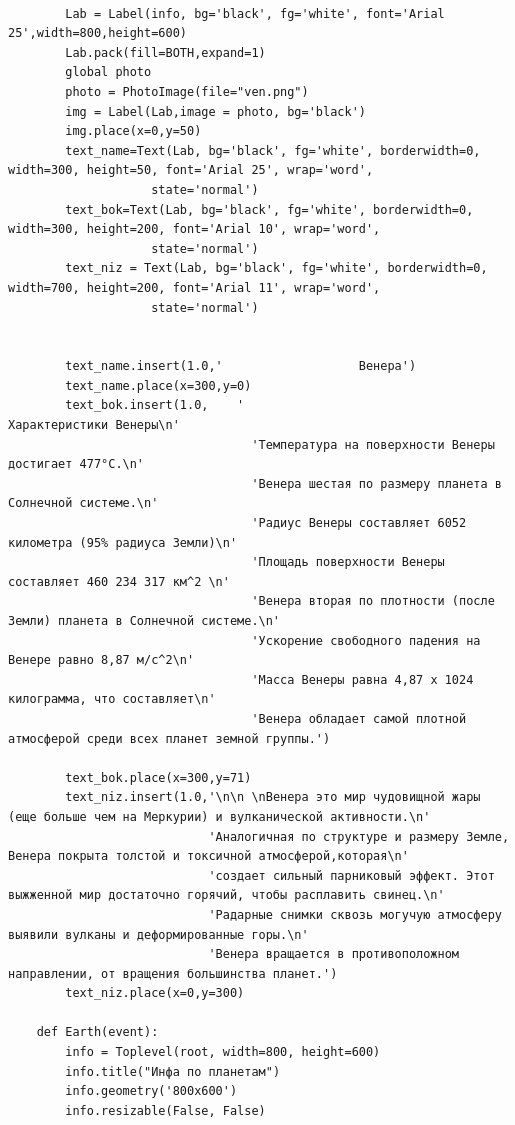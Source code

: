 \documentclass[11pt,a4paper]{report}
\begin{document}
\begin{verbatim}
    
        Lab = Label(info, bg='black', fg='white', font='Arial 25',width=800,height=600)  
        Lab.pack(fill=BOTH,expand=1)
        global photo
        photo = PhotoImage(file="ven.png")
        img = Label(Lab,image = photo, bg='black')
        img.place(x=0,y=50)
        text_name=Text(Lab, bg='black', fg='white', borderwidth=0, width=300, height=50, font='Arial 25', wrap='word',
                    state='normal')  
        text_bok=Text(Lab, bg='black', fg='white', borderwidth=0, width=300, height=200, font='Arial 10', wrap='word',
                    state='normal')  
        text_niz = Text(Lab, bg='black', fg='white', borderwidth=0, width=700, height=200, font='Arial 11', wrap='word',
                    state='normal')  
    
       
        text_name.insert(1.0,'                   Венера')
        text_name.place(x=300,y=0)
        text_bok.insert(1.0,    '                                           Характеристики Венеры\n' 
                                  'Температура на поверхности Венеры достигает 477°C.\n'
                                  'Венера шестая по размеру планета в Солнечной системе.\n'
                                  'Радиус Венеры составляет 6052 километра (95% радиуса Земли)\n'
                                  'Площадь поверхности Венеры составляет 460 234 317 км^2 \n'
                                  'Венера вторая по плотности (после Земли) планета в Солнечной системе.\n'
                                  'Ускорение свободного падения на Венере равно 8,87 м/c^2\n'
                                  'Масса Венеры равна 4,87 х 1024 килограмма, что составляет\n'
                                  'Венера обладает самой плотной атмосферой среди всех планет земной группы.')    
        
        text_bok.place(x=300,y=71)        
        text_niz.insert(1.0,'\n\n \nВенера это мир чудовищной жары (еще больше чем на Меркурии) и вулканической активности.\n'
                            'Аналогичная по структуре и размеру Земле, Венера покрыта толстой и токсичной атмосферой,которая\n'
                            'создает сильный парниковый эффект. Этот выжженной мир достаточно горячий, чтобы расплавить свинец.\n'
                            'Радарные снимки сквозь могучую атмосферу выявили вулканы и деформированные горы.\n'
                            'Венера вращается в противоположном направлении, от вращения большинства планет.')
        text_niz.place(x=0,y=300)

    def Earth(event):  
        info = Toplevel(root, width=800, height=600)
        info.title("Инфа по планетам")
        info.geometry('800x600')
        info.resizable(False, False)  
        

\end{verbatim}
\end{document}
